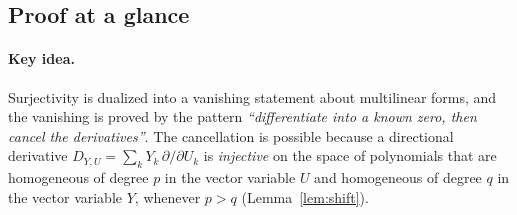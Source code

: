 \documentclass[11pt]{article}
\theoremstyle{remark}
\newcommand{\D}[2]{D_{#1,#2}}
\begin{document}
\subsection{Proof at a glance}\label{sec:glance}

\paragraph{Key idea.}
Surjectivity is dualized into a vanishing statement about multilinear
forms, and the vanishing is proved by the pattern
\emph{``differentiate into a known zero, then cancel the derivatives''}.
The cancellation is possible because a directional derivative
$\D{Y}{U}=\sum_kY_k\,\partial/\partial U_k$ is \emph{injective} on the
space of polynomials that are homogeneous of degree $p$ in the vector
variable $U$ and homogeneous of degree $q$ in the vector variable $Y$,
whenever $p>q$ (Lemma~\ref{lem:shift}).
\end{document}
